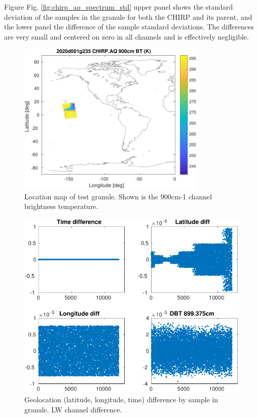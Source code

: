 \documentclass[11pt]{article}
\begin{document}
Figure Fig. \ref{fig:chirp_aq_spectrum_std} upper panel shows the standard deviation of the samples in the granule for both the CHIRP and its parent, and the lower panel the difference of the sample standard deviations. The differences are very small and centered on zero in all channels and is effectively negligible.

\begin{figure}[htbp]
\centering
\includegraphics[angle=0,width=9cm]{./figs/2020d001g235_chirp_aq_900cm_bt_map.pdf}
\caption{\label{fig:org4aee838}
Location map of test granule. Shown is the 900cm-1 channel brightness temperature.}
\end{figure}

\begin{figure}[htbp]
\centering
\includegraphics[width=.9\linewidth]{./figs/2020d001g235_chirp_aq_geo_diff.pdf}
\caption{\label{fig:orgc740253}
Geolocation (latitude, longitude, time) difference by sample in granule. LW channel difference.}
\end{figure}
\end{document}
